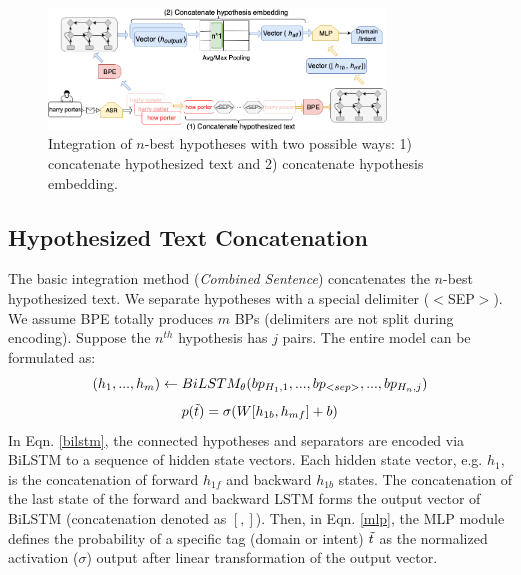 \begin{figure}[t!]
	\vspace{2em}
	\begin{center}
		\includegraphics[width=0.8\textwidth]{Graph/speech/Compress.png}
	\end{center}

	\vspace{1em}
	\caption{Integration of $n$-best hypotheses with two possible ways: 1) concatenate hypothesized text  and 2) concatenate hypothesis embedding.}
	\label{fig:integration}
\end{figure}

\subsection{Hypothesized Text Concatenation}
The basic integration method (\textit{Combined Sentence}) concatenates the $n$-best hypothesized text. We separate hypotheses with a special delimiter ($<$SEP$>$). We assume BPE totally produces $m$ BPs (delimiters are not split during encoding). Suppose the $n^{th}$ hypothesis has $j$ pairs. The entire model can be formulated as:
\begin{equation}
\small{
	(h_1, ... , h_m)\leftarrow BiLSTM_{\theta}(bp_{H_1, 1},...,bp_{<sep>},...,bp_{H_n, j})
}
\label{bilstm}
\end{equation}
\begin{equation}
\small{
	p(\Tilde{t}) = \sigma(W[h_{1b}, h_{mf}] +b)
}
\label{mlp}
\end{equation}
In Eqn. \ref{bilstm}, the connected hypotheses and separators are encoded via BiLSTM to a sequence of hidden state vectors. Each hidden state vector, e.g. $h_1$, is the concatenation of forward $h_{1f}$ and backward $h_{1b}$ states. The concatenation of the last state of the forward and backward LSTM forms the output vector of BiLSTM (concatenation denoted as $[,]$). Then, in Eqn. \ref{mlp}, the MLP module defines the probability of a specific tag (domain or intent)  $\Tilde{t}$ as the normalized activation ($\sigma$) output  after linear transformation of the output vector.

